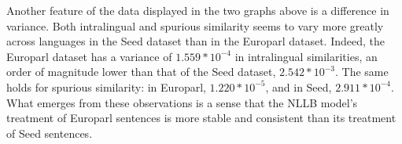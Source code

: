Another feature of the data displayed in the two graphs above is a difference in variance. Both intralingual and spurious similarity seems to vary more greatly across languages in the Seed dataset than in the Europarl dataset. Indeed, the Europarl dataset has a variance of $1.559 * 10^{-4}$ in intralingual similarities, an order of magnitude lower than that of the Seed dataset, $2.542 * 10^{-3}$. The same holds for spurious similarity: in Europarl, $1.220 * 10^{-5}$, and in Seed, $2.911 * 10^{-4}$. What emerges from these observations is a sense that the NLLB model's treatment of Europarl sentences is more stable and consistent than its treatment of Seed sentences. 










